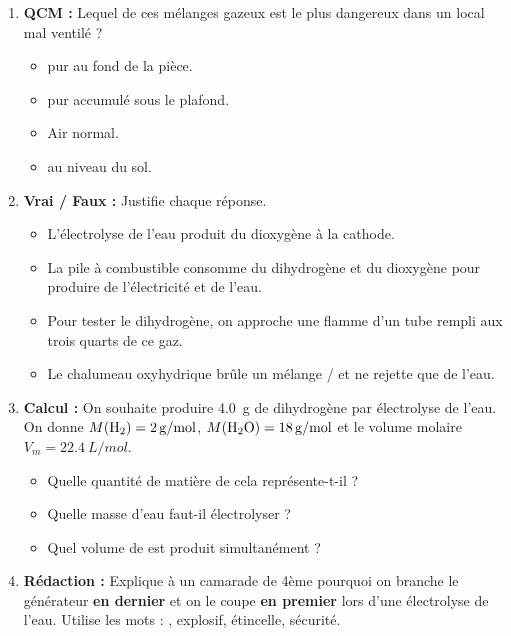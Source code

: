 \documentclass[11pt]{article}
\begin{document}
\begin{exercice}
\begin{enumerate}
    \item \textbf{QCM :} Lequel de ces mélanges gazeux est le plus dangereux dans un local mal ventilé ?
    \begin{itemize}
        \item[A.]  pur au fond de la pièce.
        \item[B.]  pur accumulé sous le plafond.
        \item[C.] Air normal.
        \item[D.]  au niveau du sol.
    \end{itemize}
    \item \textbf{Vrai / Faux :} Justifie chaque réponse.
    \begin{itemize}
        \item[a.] L'électrolyse de l'eau produit du dioxygène à la cathode.
        \item[b.] La pile à combustible consomme du dihydrogène et du dioxygène pour produire de l'électricité et de l'eau.
        \item[c.] Pour tester le dihydrogène, on approche une flamme d'un tube rempli aux trois quarts de ce gaz.
        \item[d.] Le chalumeau oxyhydrique brûle un mélange / et ne rejette que de l'eau.
    \end{itemize}
    \item \textbf{Calcul :} On souhaite produire \SI{4,0}{g} de dihydrogène par électrolyse de l'eau. On donne $M(\ce{H2}) = \SI{2}{g/mol}$, $M(\ce{H2O}) = \SI{18}{g/mol}$ et le volume molaire $V_m = \SI{22,4}{L/mol}$.
    \begin{itemize}
        \item[a.] Quelle quantité de matière de  cela représente-t-il ?
        \item[b.] Quelle masse d'eau faut-il électrolyser ?
        \item[c.] Quel volume de  est produit simultanément ?
    \end{itemize}
    \item \textbf{Rédaction :} Explique à un camarade de 4ème pourquoi on branche le générateur \textbf{en dernier} et on le coupe \textbf{en premier} lors d'une électrolyse de l'eau. Utilise les mots : , explosif, étincelle, sécurité.
\end{enumerate}
\end{exercice}
\end{document}
